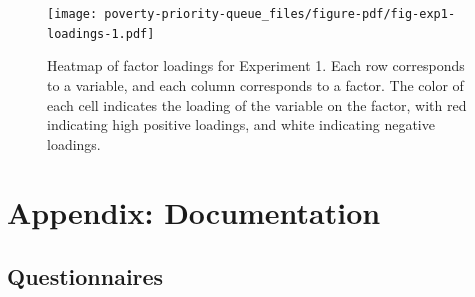 \documentclass[
]{report}
\begin{document}
\begin{figure}

{\centering \texttt{[image: poverty-priority-queue\_files/figure-pdf/fig-exp1-loadings-1.pdf]}

}

\caption{\label{fig-exp1-loadings}Heatmap of factor loadings for
Experiment 1. Each row corresponds to a variable, and each column
corresponds to a factor. The color of each cell indicates the loading of
the variable on the factor, with red indicating high positive loadings,
and white indicating negative loadings.}

\end{figure}

\hypertarget{appendix-documentation}{%
\chapter{Appendix: Documentation}\label{appendix-documentation}}

\hypertarget{sec-questionnaires}{%
\section{Questionnaires}\label{sec-questionnaires}}
\end{document}
